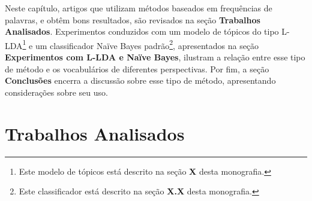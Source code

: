 Neste capítulo, artigos que utilizam métodos baseados em frequências de palavras, e obtêm bons resultados, são revisados na seção \textbf{Trabalhos Analisados}. Experimentos conduzidos com um modelo de tópicos do tipo L-LDA\footnote{Este modelo de tópicos está descrito na seção \textbf{X} desta monografia.} e um classificador Naïve Bayes padrão\footnote{Este classificador está descrito na seção \textbf{X.X} desta monografia.}, apresentados na seção \textbf{Experimentos com L-LDA e Naïve Bayes}, ilustram a relação entre esse tipo de método e os vocabulários de diferentes perspectivas. Por fim, a seção \textbf{Conclusões} encerra a discussão sobre esse tipo de método, apresentando considerações sobre seu uso.

\section{Trabalhos Analisados}






